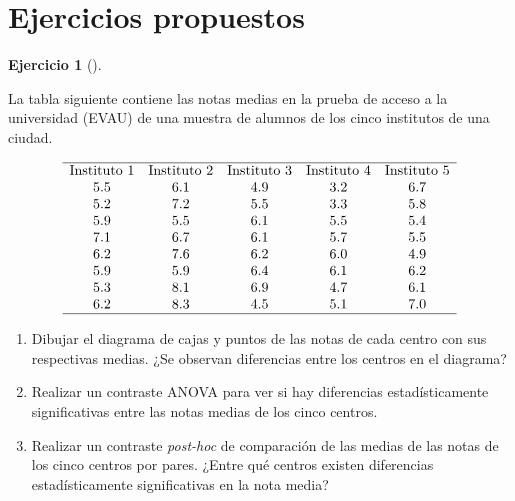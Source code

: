 \documentclass[
  a4paper,
]{scrreport}
\theoremstyle{definition}
\newtheorem{exercise}{Ejercicio}[chapter]
\theoremstyle{remark}
\begin{document}
\section{Ejercicios propuestos}\label{ejercicios-propuestos-7}

\begin{exercise}[]\protect\hypertarget{exr-anova-un-factor-evau}{}\label{exr-anova-un-factor-evau}

La tabla siguiente contiene las notas medias en la prueba de acceso a la
universidad (EVAU) de una muestra de alumnos de los cinco institutos de
una ciudad.

\[
\begin{array}{ccccc}
\hline
\mbox{Instituto 1} & \mbox{Instituto 2} & \mbox{Instituto 3} & \mbox{Instituto 4} & \mbox{Instituto 5} \\
5.5 & 6.1 & 4.9 & 3.2 & 6.7 \\
5.2 & 7.2 & 5.5 & 3.3 & 5.8 \\
5.9 & 5.5 & 6.1 & 5.5 & 5.4 \\
7.1 & 6.7 & 6.1 & 5.7 & 5.5 \\
6.2 & 7.6 & 6.2 & 6.0 & 4.9 \\
5.9 & 5.9 & 6.4 & 6.1 & 6.2 \\
5.3 & 8.1 & 6.9 & 4.7 & 6.1 \\
6.2 & 8.3 & 4.5 & 5.1 & 7.0 \\
\hline
\end{array}
\]

\begin{enumerate}
\def\labelenumi{\alph{enumi}.}
\item
  Dibujar el diagrama de cajas y puntos de las notas de cada centro con
  sus respectivas medias. ¿Se observan diferencias entre los centros en
  el diagrama?
\item
  Realizar un contraste ANOVA para ver si hay diferencias
  estadísticamente significativas entre las notas medias de los cinco
  centros.
\item
  Realizar un contraste \emph{post-hoc} de comparación de las medias de
  las notas de los cinco centros por pares. ¿Entre qué centros existen
  diferencias estadísticamente significativas en la nota media?
\end{enumerate}

\end{exercise}
\end{document}
